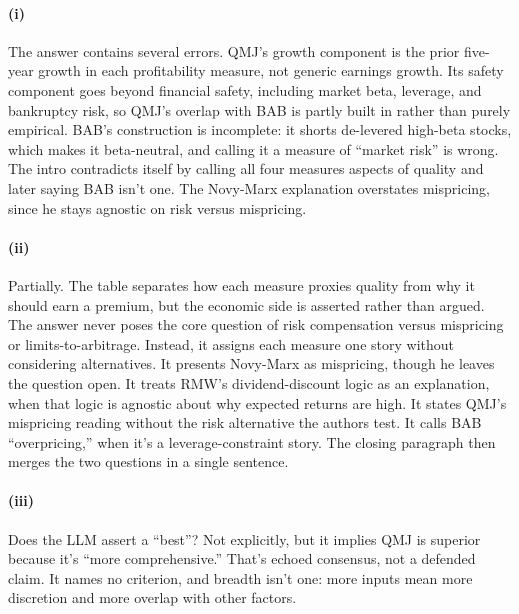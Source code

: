 \paragraph{(i)}
The answer contains several errors. QMJ's growth component is the prior five-year growth in each profitability measure, not generic earnings growth. Its safety component goes beyond financial safety, including market beta, leverage, and bankruptcy risk, so QMJ's overlap with BAB is partly built in rather than purely empirical. BAB's construction is incomplete: it shorts de-levered high-beta stocks, which makes it beta-neutral, and calling it a measure of ``market risk'' is wrong. The intro contradicts itself by calling all four measures aspects of quality and later saying BAB isn't one. The Novy-Marx explanation overstates mispricing, since he stays agnostic on risk versus mispricing.

\paragraph{(ii)}
Partially. The table separates how each measure proxies quality from why it should earn a premium, but the economic side is asserted rather than argued. The answer never poses the core question of risk compensation versus mispricing or limits-to-arbitrage. Instead, it assigns each measure one story without considering alternatives. It presents Novy-Marx as mispricing, though he leaves the question open. It treats RMW's dividend-discount logic as an explanation, when that logic is agnostic about why expected returns are high. It states QMJ's mispricing reading without the risk alternative the authors test. It calls BAB ``overpricing,'' when it's a leverage-constraint story. The closing paragraph then merges the two questions in a single sentence.

\paragraph{(iii)}
Does the LLM assert a ``best''? Not explicitly, but it implies QMJ is superior because it's ``more comprehensive.'' That's echoed consensus, not a defended claim. It names no criterion, and breadth isn't one: more inputs mean more discretion and more overlap with other factors.

